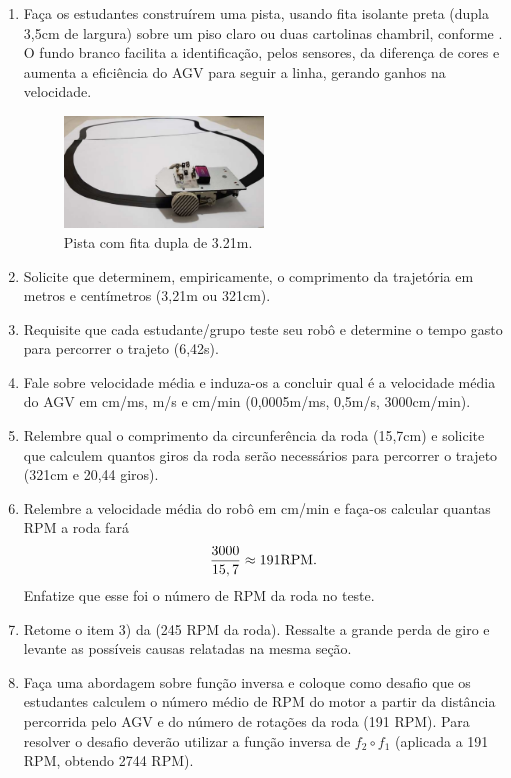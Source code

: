 \documentclass{textolivre-html}
\begin{document}
\begin{enumerate}
\item Faça os estudantes construírem uma pista, usando fita isolante preta
(dupla 3,5cm de largura) sobre um piso claro ou duas cartolinas chambril,
conforme . O fundo branco facilita a identificação, pelos sensores, da
diferença de cores e aumenta a eficiência do AGV para seguir a linha, gerando
ganhos na velocidade.

\begin{figure}[h!]
\centering
\includegraphics[width=0.5\textwidth]{figure-28.pdf}
\caption{Pista com fita dupla de 3.21m.}
\label{fig18}
\end{figure}

\item Solicite que determinem, empiricamente, o comprimento da trajetória em metros e centímetros (3,21m ou 321cm).
\item Requisite que cada estudante/grupo teste seu robô e determine o tempo gasto para percorrer o trajeto (6,42s).
\item Fale sobre velocidade média e induza-os a concluir qual é a velocidade média do AGV em cm/ms, m/s e cm/min (0,0005m/ms, 0,5m/s, 3000cm/min).
\item Relembre qual o comprimento da circunferência da roda (15,7cm) e solicite
que calculem quantos giros da roda serão necessários para percorrer o trajeto
(321cm e 20,44 giros).
\item\label{itm6} Relembre a velocidade média do robô em cm/min e faça-os calcular quantas
RPM a roda fará 
$$ 
\frac{3000}{15,7} \approx 191 \textmd{RPM}.
$$
Enfatize que esse foi o número de RPM da roda no teste.
\item Retome o item 3) da  (245 RPM da roda). Ressalte a grande
perda de giro e levante as possíveis causas relatadas na mesma seção.
\item Faça uma abordagem sobre função inversa e coloque como desafio que os
estudantes calculem o número médio de RPM do motor a partir da distância
percorrida pelo AGV e do número de rotações da roda (191 RPM). Para resolver o
desafio deverão utilizar a função inversa de $f_2 \circ f_1$ (aplicada a 191
RPM, obtendo 2744 RPM).
\end{enumerate}
\end{document}
